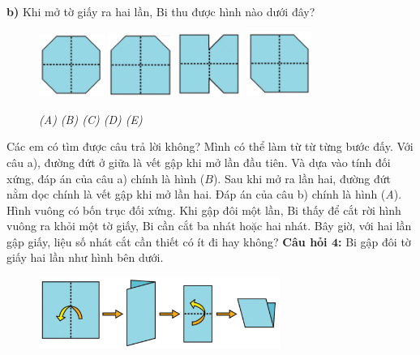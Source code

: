 \textbf{b)} Khi mở tờ giấy ra hai lần, Bi thu được hình nào dưới đây?
\begin{figure}[H]
	\centering
	\captionsetup{labelformat=empty}
	\vspace*{-5pt}
	\captionsetup{justification=centering}
	\includegraphics[width =0.19\textwidth]{cat-9a}
	\hfill
	\includegraphics[width =0.19\textwidth]{cat-9b}
	\hfill
	\includegraphics[width =0.19\textwidth]{cat-9c}
	\hfill
	\includegraphics[width =0.19\textwidth]{cat-9d}
	\caption{\small \it (A) \hfill (B) \hfill (C) \hfill (D) \hfill (E)}
\end{figure}
Các em có tìm được câu trả lời không? Mình có thể làm từ từ từng bước đấy. Với câu a), đường đứt ở giữa là vết gập khi mở lần đầu tiên. Và dựa vào tính đối xứng, đáp án của câu a) chính là hình ($B$).
\vskip 0.1cm
Sau khi mở ra lần hai, đường đứt nằm dọc chính là vết gập khi mở lần hai. Đáp án của câu b) chính là hình (\textit{A}).
\vskip 0.1cm
Hình vuông có bốn trục đối xứng. Khi gập đôi một lần, Bi thấy để cắt rời hình vuông ra khỏi một tờ giấy, Bi cần cắt ba nhát hoặc hai nhát. Bây giờ, với hai lần gập giấy, liệu số nhát cắt cần thiết có ít đi hay không?
\vskip 0.1cm
\textbf{Câu hỏi $\pmb{4}$:} Bi gập đôi tờ giấy hai lần như hình bên dưới. 
\begin{figure}[H]
	\captionsetup{labelformat=empty}
	\vspace*{-5pt}
	\centering
	\captionsetup{justification=raggedleft}
	\includegraphics[width =0.7\textwidth]{cat-10}
	\vspace*{-10pt}
\end{figure}
